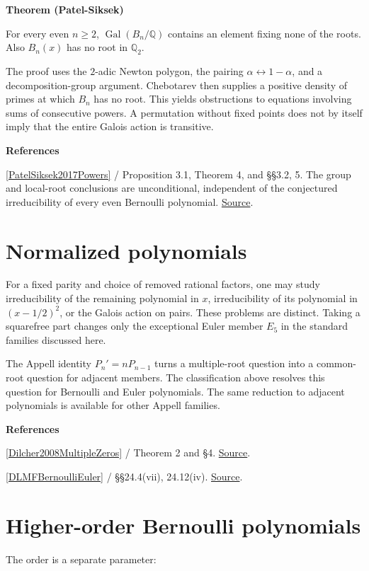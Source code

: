 \documentclass[11pt,a4paper,oneside,openany]{book}
\newenvironment{sources}{\par\smallskip\begingroup\footnotesize\color{atlasgray}\leftskip=10pt\setlength{\parskip}{2pt}}{\par\endgroup\smallskip}
\begin{document}
\begin{atlasblock}[standard]
\textbf{\sffamily Theorem (Patel-Siksek)}\par\smallskip
\color{black} For every even \(n\ge2\), \(\operatorname{Gal}(B_n/\mathbb Q)\) contains an element fixing none of the roots. Also \(B_n(x)\) has no root in \(\mathbb Q_2\).\par
\end{atlasblock}\color{black}
\color{black} The proof uses the \(2\)-adic Newton polygon, the pairing \(\alpha\leftrightarrow1-\alpha\), and a decomposition-group argument. Chebotarev then supplies a positive density of primes at which \(B_n\) has no root. This yields obstructions to equations involving sums of consecutive powers. A permutation without fixed points does not by itself imply that the entire Galois action is transitive.\par
\begin{sources}
\textbf{References}\par\smallskip
\noindent\hyperlink{ref:PatelSiksek2017Powers}{[PatelSiksek2017Powers]} / Proposition 3.1, Theorem 4, and §§3.2, 5. The group and local-root conclusions are unconditional, independent of the conjectured irreducibility of every even Bernoulli polynomial. \href{https://doi.org/10.1007/s40993-016-0068-0}{Source}.\par
\end{sources}\color{black}
\section{Normalized polynomials}
\color{black} For a fixed parity and choice of removed rational factors, one may study irreducibility of the remaining polynomial in \(x\), irreducibility of its polynomial in \((x-1/2)^2\), or the Galois action on pairs. These problems are distinct. Taking a squarefree part changes only the exceptional Euler member \(E_5\) in the standard families discussed here.\par
\color{black} The Appell identity \(P_n'=nP_{n-1}\) turns a multiple-root question into a common-root question for adjacent members. The classification above resolves this question for Bernoulli and Euler polynomials. The same reduction to adjacent polynomials is available for other Appell families.\par
\begin{sources}
\textbf{References}\par\smallskip
\noindent\hyperlink{ref:Dilcher2008MultipleZeros}{[Dilcher2008MultipleZeros]} / Theorem 2 and §4.  \href{https://doi.org/10.4064/aa134-2-6}{Source}.\par
\noindent\hyperlink{ref:DLMFBernoulliEuler}{[DLMFBernoulliEuler]} / §§24.4(vii), 24.12(iv).  \href{https://dlmf.nist.gov/24}{Source}.\par
\end{sources}\color{black}
\section{Higher-order Bernoulli polynomials}
\color{black} The order is a separate parameter:\par
\end{document}

